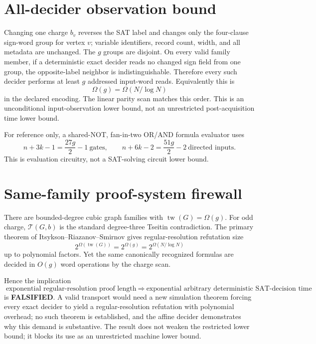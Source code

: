 \documentclass[11pt]{article}
\begin{document}
\section{All-decider observation bound}
Changing one charge $b_v$ reverses the SAT label and changes only the four-clause sign-word group for vertex $v$; variable identifiers, record count, width, and all metadata are unchanged. The $g$ groups are disjoint. On every valid family member, if a deterministic exact decider reads no changed sign field from one group, the opposite-label neighbor is indistinguishable. Therefore every such decider performs at least $g$ addressed input-word reads. Equivalently this is
\[
  \Omega(g)=\Omega(N/\log N)
\]
in the declared encoding. The linear parity scan matches this order. This is an unconditional input-observation lower bound, not an unrestricted post-acquisition time lower bound.

For reference only, a shared-NOT, fan-in-two OR/AND formula evaluator uses
\[
  n+3k-1=\frac{27g}{2}-1\ \text{gates},\qquad
  n+6k-2=\frac{51g}{2}-2\ \text{directed inputs}.
\]
This is evaluation circuitry, not a SAT-solving circuit lower bound.

\section{Same-family proof-system firewall}
There are bounded-degree cubic graph families with $\operatorname{tw}(G)=\Omega(g)$. For odd charge, $\mathcal T(G,b)$ is the standard degree-three Tseitin contradiction. The primary theorem of Itsykson--Riazanov--Smirnov gives regular-resolution refutation size
\[
  2^{\Omega(\operatorname{tw}(G))}=2^{\Omega(g)}
  =2^{\Omega(N/\log N)}
\]
up to polynomial factors. Yet the same canonically recognized formulas are decided in $O(g)$ word operations by the charge scan.

Hence the implication
\[
\text{exponential regular-resolution proof length}
\ \Longrightarrow\
\text{exponential arbitrary deterministic SAT-decision time}
\]
is \textbf{FALSIFIED}. A valid transport would need a new simulation theorem forcing every exact decider to yield a regular-resolution refutation with polynomial overhead; no such theorem is established, and the affine decider demonstrates why this demand is substantive. The result does not weaken the restricted lower bound; it blocks its use as an unrestricted machine lower bound.
\end{document}
